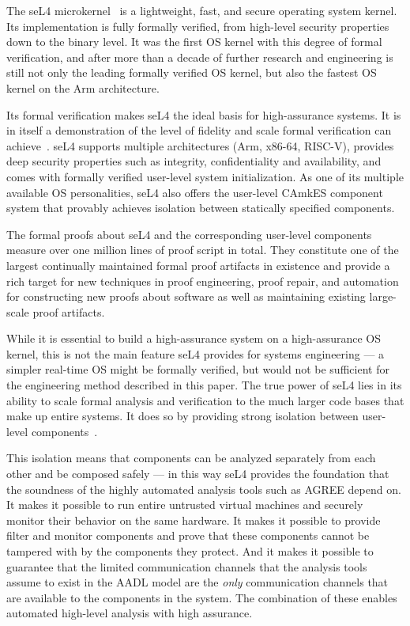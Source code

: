 
The seL4 microkernel~\cite{sel4-sosp09} is a lightweight, fast, and secure
operating system kernel. Its implementation is fully formally verified,
from high-level security properties down to the binary level. It was the first
OS kernel with this degree of formal verification, and after more than a decade
of further research and engineering is still not only the leading formally
verified OS kernel, but also the fastest OS kernel on the Arm architecture.

Its formal verification makes seL4 the ideal basis for high-assurance systems.
It is in itself a demonstration of the level of fidelity and scale formal
verification can achieve~\cite{sel4-tocs14}. seL4 supports multiple architectures
(Arm, x86-64, RISC-V), provides deep security properties such as integrity,
confidentiality and availability, and comes with formally verified user-level
system initialization. As one of its multiple available OS personalities, seL4 
also offers the user-level CAmkES component system that provably achieves isolation
between statically specified components.

The formal proofs about seL4 and the corresponding user-level components measure
over one million lines of proof script in total. They constitute one of the
largest continually maintained formal proof artifacts in existence and provide a
rich target for new techniques in proof engineering, proof repair, and
automation for constructing new proofs about software as well as maintaining
existing large-scale proof artifacts.

While it is essential to build a high-assurance system on a high-assurance OS
kernel, this is not the main feature seL4 provides for systems engineering --- a
simpler real-time OS might be formally verified, but would not be sufficient for the
engineering method described in this paper. The true power of seL4 lies in its
ability to scale formal analysis and verification to the much larger code bases
that make up entire systems. It does so by providing strong isolation between
user-level components~\cite{sel4-cacm18}.

This isolation means that components can be analyzed separately from each other
and be composed safely --- in this way seL4 provides the foundation that the soundness of the highly
automated analysis tools such as AGREE depend on. It makes it possible to run
entire untrusted virtual machines and securely monitor their behavior on the
same hardware. It makes it possible to provide filter and monitor components and
prove that these components cannot be tampered with by the components they protect.
And it makes it possible to guarantee that the limited communication channels that the analysis tools
assume to exist in the AADL model are the \emph{only} communication channels that are available to the
components in the system. The combination of these enables automated
high-level analysis with high assurance.

